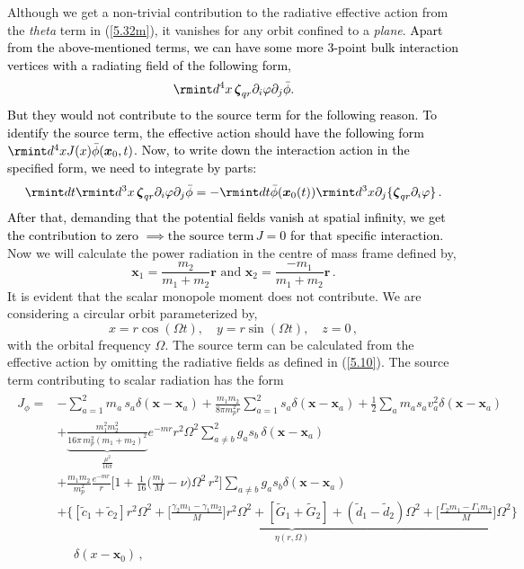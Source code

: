 Although we get a non-trivial contribution to the radiative effective action from the \textit{theta} term in (\ref{5.32m}), it vanishes for any orbit confined to a \textit{plane}. %
\textcolor{black}{Apart from the above-mentioned terms, we can have some more 3-point bulk interaction vertices with a radiating field of the following form,
\begin{equation}
\rmint d^4x \, \boldsymbol{\zeta}_{qr}\partial_{i}\varphi\partial_{j}\Bar{\phi}. \label{5.36n}
\end{equation}
But they would not contribute to the source term for the following reason. To identify the source term, the effective action should have the following form $\rmint d^4x J(x)\Bar{\phi}(\boldsymbol{x}_0,t)$. 
 Now, to write down the interaction action in the specified form, we need to  integrate by parts:
 \begin{equation}
    \rmint dt \rmint d^3x \, \boldsymbol{\zeta}_{qr}\partial_{i}\varphi\partial_{j}\Bar{\phi}=-\rmint dt\Bar{\phi}(\boldsymbol{x}_0(t))\rmint d^3x \partial_{j}\{\boldsymbol{\zeta}_{qr}\partial_{i}\varphi\}\,.
 \end{equation} 
 After that, demanding that the potential fields vanish at spatial infinity, we get the contribution to zero $\implies \text{the source term}\,J=0$ for that specific interaction.}
\\
Now we will calculate the power radiation in the centre of mass frame defined by, $$\boldsymbol{x}_1=\frac{m_2}{m_1+m_2}\boldsymbol{r} \textrm{ and } \boldsymbol{x}_2=\frac{-m_1}{m_1+m_2}\boldsymbol{r}\,.$$
It is evident that the scalar monopole moment does not contribute. We are considering a circular orbit parameterized by, $$x=r \cos(\Omega t),\quad y=r \sin(\Omega t), \quad z=0\,,$$ with the orbital frequency $\Omega$.
The source term can be calculated from the effective action by omitting the radiative fields as defined in (\ref{5.10}). The source term contributing to scalar radiation has the form
\begin{align}
    \begin{split}
        J_{\phi}=& -\sum_{a=1}^{2}m_a\,s_a\delta(\boldsymbol{x}-\boldsymbol{x}_a)+\frac{m_1m_2}{8\pi m_p^2 r}\sum_{a=1}^{2}s_a \delta(\boldsymbol{x}-\boldsymbol{x}_a)+\frac{1}{2}\sum_{a}m_as_av_a^2\delta(\boldsymbol{x}-\boldsymbol{x}_a)\\&
       +\underbrace{ \frac{m_1^2 m_2^2}{16 \pi \,m_p^2(m_1+m_2)^2}}_{\frac{\mu^2}{16\pi}}e^{-mr}r^2\Omega^2\sum_{a\ne b}^{2}g_a s_{b}\,\delta(\boldsymbol{x}-\boldsymbol{x}_a)\\ &+\frac{m_1m_2}{m_p^2} \frac{e^{-mr}}{r}\Big[1+\frac{1}{16}\Big(\frac{m_1}{M}-\nu\Big)\Omega^2\,r^2\Big]\sum_{a\ne b}g_a s_b \delta(\boldsymbol{x}-\boldsymbol{x}_a)\\&+\underbrace{\Big\{[\tilde{c}_1+\tilde{c}_2]r^2\Omega^2+\Big[\frac{\gamma_2m_1-\gamma_1m_2}{M}\Big]r^2\Omega^2+[\tilde{G}_1+\tilde{G}_2]+(\tilde{d}_1-\tilde{d}_2)\Omega^2+\Big[\frac{\Gamma_2m_1-\Gamma_1m_2}{M}\Big]\Omega^2\Big\}}_{\eta(r,\Omega)}\\& \,\,\,\,\,\,\,\,\delta(x-\boldsymbol{x}_0)\,,
    \end{split}
\end{align}
